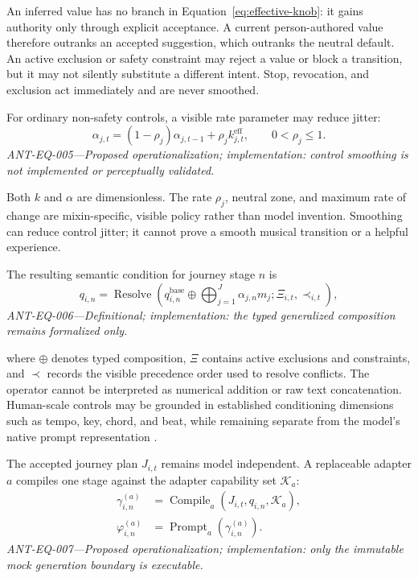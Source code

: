 An inferred value has no branch in Equation~\ref{eq:effective-knob}: it gains
authority only through explicit acceptance. A current person-authored value
therefore outranks an accepted suggestion, which outranks the neutral default.
An active exclusion or safety constraint may reject a value or block a
transition, but it may not silently substitute a different intent. Stop,
revocation, and exclusion act immediately and are never smoothed.

For ordinary non-safety controls, a visible rate parameter may reduce jitter:
\begin{equation}
  \alpha_{j,t}
  = (1-\rho_j)\alpha_{j,t-1}+\rho_j k^{\mathrm{eff}}_{j,t},
  \qquad 0<\rho_j\leq 1.
  \label{eq:mixin-smoothing}
\end{equation}
\noindent\textit{ANT-EQ-005---Proposed operationalization; implementation:
control smoothing is not implemented or perceptually validated.}

Both $k$ and $\alpha$ are dimensionless. The rate $\rho_j$, neutral zone, and
maximum rate of change are mixin-specific, visible policy rather than model
invention. Smoothing can reduce control jitter; it cannot prove a smooth
musical transition or a helpful experience.

The resulting semantic condition for journey stage $n$ is
\begin{equation}
  q_{i,n} =
  \operatorname{Resolve}\!\left(
    q^{\mathrm{base}}_{i,n}
    \mathbin{\oplus}
    \bigoplus_{j=1}^{J}\alpha_{j,n}m_j;
    \Xi_{i,t},\prec_{i,t}
  \right),
  \label{eq:semantic-condition}
\end{equation}
\noindent\textit{ANT-EQ-006---Definitional; implementation: the typed
generalized composition remains formalized only.}

where $\oplus$ denotes typed composition, $\Xi$ contains active exclusions and
constraints, and $\prec$ records the visible precedence order used to resolve
conflicts. The operator cannot be interpreted as numerical addition or raw
text concatenation. Human-scale controls may be grounded in established
conditioning dimensions such as tempo, key, chord, and beat, while remaining
separate from the model's native prompt representation
\citep{melechovsky2024mustango,tal2024jasco}.

The accepted journey plan $J_{i,t}$ remains model independent. A replaceable
adapter $a$ compiles one stage against the adapter capability set
$\mathcal{K}_a$:
\begin{equation}
  \begin{aligned}
    \gamma^{(a)}_{i,n}
      &= \operatorname{Compile}_{a}
         \!\left(J_{i,t},q_{i,n},\mathcal{K}_a\right),\\
    \varphi^{(a)}_{i,n}
      &= \operatorname{Prompt}_{a}\!\left(\gamma^{(a)}_{i,n}\right).
  \end{aligned}
  \label{eq:adapter-compilation}
\end{equation}
\noindent\textit{ANT-EQ-007---Proposed operationalization; implementation:
only the immutable mock generation boundary is executable.}

